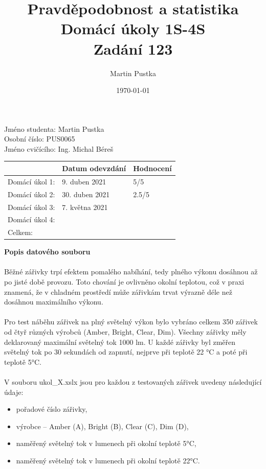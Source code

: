\documentclass[czech]{article}%
\title{Pravděpodobnost a statistika\\
    \large Domácí úkoly 1S-4S\\
    \large Zadání 123}
\author{Martin Pustka}
\date{\today}
\begin{document}
\maketitle

\noindent
Jméno studenta: Martin Pustka\\
Osobní číslo: PUS0065\\
Jméno cvičícího: Ing. Michal Béreš\\

\begin{table}[!b]
    \centering
    \begin{tabular}{|l|p{5cm}|p{3cm}|}
        \hline
        & Datum odevzdání & Hodnocení \\
        \hline
        Domácí úkol 1: & 9. duben 2021 & 5/5 \\
        \hline
        Domácí úkol 2: & 30. duben 2021 & 2.5/5\\
        \hline
        Domácí úkol 3: & 7. května 2021 & \\
        \hline
        Domácí úkol 4: & & \\
        \hline
        Celkem: & & \\
        \hline
    \end{tabular}
\end{table}
\newpage
\tableofcontents
\newpage

\noindent
\textbf{Popis datového souboru}
\\\\
\noindent
Běžné zářivky trpí efektem pomalého nabíhání, tedy plného výkonu dosáhnou až po jisté době provozu. Toto chování je ovlivněno okolní teplotou, což v praxi znamená, že v chladném prostředí může zářivkám trvat výrazně déle než dosáhnou maximálního výkonu. 
\\\\
\noindent
Pro test náběhu zářivek na plný světelný výkon bylo vybráno celkem 350 zářivek od čtyř různých výrobců (Amber, Bright, Clear, Dim). Všechny zářivky měly deklarovaný maximální světelný tok 1000 lm. U každé zářivky byl změřen světelný tok po 30 sekundách od zapnutí, nejprve při teplotě 22 °C a poté při teplotě 5°C.
\\\\
\noindent
V souboru ukol\_X.xslx jsou pro každou z testovaných zářivek uvedeny následující údaje:
\begin{itemize}
    \item pořadové číslo zářivky,
    \item výrobce – Amber (A), Bright (B), Clear (C), Dim (D),
    \item naměřený světelný tok v lumenech při okolní teplotě 5°C,
    \item naměřený světelný tok v lumenech při okolní teplotě 22°C.
\end{itemize}
\end{document}
